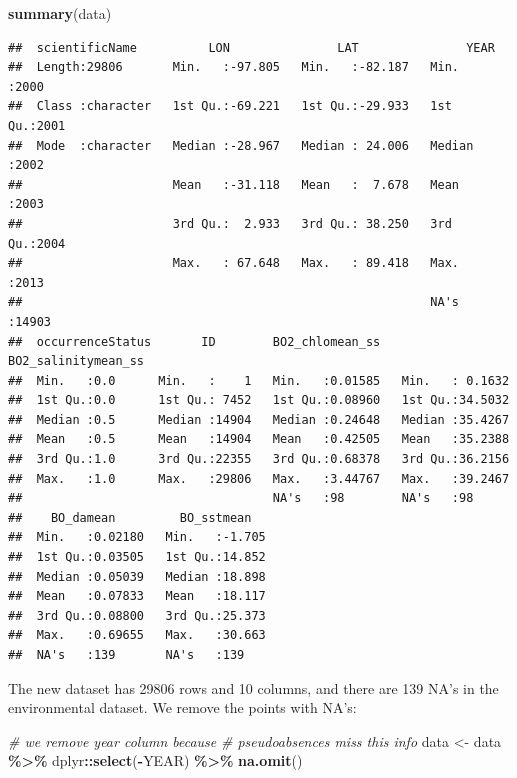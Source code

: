 \documentclass[
]{book}
\newenvironment{Shaded}{\begin{snugshade}}{\end{snugshade}}
\newcommand{\CommentTok}[1]{\textcolor[rgb]{0.56,0.35,0.01}{\textit{#1}}}
\newcommand{\FunctionTok}[1]{\textcolor[rgb]{0.13,0.29,0.53}{\textbf{#1}}}
\newcommand{\NormalTok}[1]{#1}
\newcommand{\OtherTok}[1]{\textcolor[rgb]{0.56,0.35,0.01}{#1}}
\newcommand{\SpecialCharTok}[1]{\textcolor[rgb]{0.81,0.36,0.00}{\textbf{#1}}}
\begin{document}
\begin{Shaded}
\begin{Highlighting}[]
\FunctionTok{summary}\NormalTok{(data)}
\end{Highlighting}
\end{Shaded}

\begin{verbatim}
##  scientificName          LON               LAT               YEAR      
##  Length:29806       Min.   :-97.805   Min.   :-82.187   Min.   :2000   
##  Class :character   1st Qu.:-69.221   1st Qu.:-29.933   1st Qu.:2001   
##  Mode  :character   Median :-28.967   Median : 24.006   Median :2002   
##                     Mean   :-31.118   Mean   :  7.678   Mean   :2003   
##                     3rd Qu.:  2.933   3rd Qu.: 38.250   3rd Qu.:2004   
##                     Max.   : 67.648   Max.   : 89.418   Max.   :2013   
##                                                         NA's   :14903  
##  occurrenceStatus       ID        BO2_chlomean_ss   BO2_salinitymean_ss
##  Min.   :0.0      Min.   :    1   Min.   :0.01585   Min.   : 0.1632    
##  1st Qu.:0.0      1st Qu.: 7452   1st Qu.:0.08960   1st Qu.:34.5032    
##  Median :0.5      Median :14904   Median :0.24648   Median :35.4267    
##  Mean   :0.5      Mean   :14904   Mean   :0.42505   Mean   :35.2388    
##  3rd Qu.:1.0      3rd Qu.:22355   3rd Qu.:0.68378   3rd Qu.:36.2156    
##  Max.   :1.0      Max.   :29806   Max.   :3.44767   Max.   :39.2467    
##                                   NA's   :98        NA's   :98         
##    BO_damean         BO_sstmean    
##  Min.   :0.02180   Min.   :-1.705  
##  1st Qu.:0.03505   1st Qu.:14.852  
##  Median :0.05039   Median :18.898  
##  Mean   :0.07833   Mean   :18.117  
##  3rd Qu.:0.08800   3rd Qu.:25.373  
##  Max.   :0.69655   Max.   :30.663  
##  NA's   :139       NA's   :139
\end{verbatim}

The new dataset has 29806 rows and 10 columns, and there are 139 NA's in the environmental dataset. We remove the points with NA's:

\begin{Shaded}
\begin{Highlighting}[]
\CommentTok{\# we remove year column because}
\CommentTok{\# pseudoabsences miss this info}
\NormalTok{data }\OtherTok{\textless{}{-}}\NormalTok{ data }\SpecialCharTok{\%\textgreater{}\%}
\NormalTok{    dplyr}\SpecialCharTok{::}\FunctionTok{select}\NormalTok{(}\SpecialCharTok{{-}}\NormalTok{YEAR) }\SpecialCharTok{\%\textgreater{}\%}
    \FunctionTok{na.omit}\NormalTok{()}
\end{Highlighting}
\end{Shaded}
\end{document}
